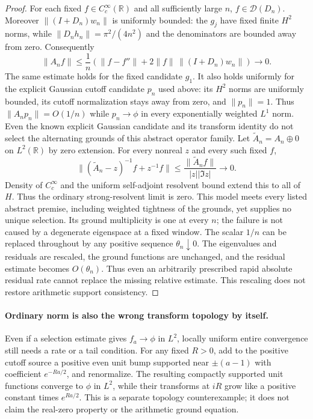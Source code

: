 \begin{proof}
For each fixed $f\in C_c^\infty(\mathbb R)$ and all sufficiently large
$n$, $f\in\mathcal D(D_n)$. Moreover
$\|(I+D_n)w_n\|$ is uniformly bounded: the $g_j$ have fixed finite
$H^2$ norms, while $\|D_nh_n\|=\pi^2/(4n^2)$ and the denominators
are bounded away from zero. Consequently
\[
 \|A_nf\|\le\frac1n\left(\|f-f''\|
        +2\|f\|\,\|(I+D_n)w_n\|\right)\longrightarrow0.
\]
The same estimate holds for the fixed candidate $g_1$. It also holds
uniformly for the explicit Gaussian cutoff candidate $p_n$ used above:
its $H^2$ norms are uniformly bounded, its cutoff normalization stays
away from zero, and $\|p_n\|=1$. Thus $\|A_np_n\|=O(1/n)$ while
$p_n\to\phi$ in every exponentially weighted $L^1$ norm. Even the
known explicit Gaussian candidate and its transform identity do not
select the alternating grounds of this abstract operator family.
Let $\widetilde A_n=A_n\oplus0$ on $L^2(\mathbb R)$ by zero extension.
For every nonreal $z$ and every such fixed $f$,
\[
 \|(\widetilde A_n-z)^{-1}f+z^{-1}f\|
 \le\frac{\|\widetilde A_nf\|}{|z||\Im z|}\to0.
\]
Density of $C_c^\infty$ and the uniform self-adjoint resolvent bound
extend this to all of $H$. Thus the ordinary strong-resolvent limit
is zero. This model meets every listed abstract premise, including
weighted tightness of the grounds, yet supplies no unique selection.
Its ground multiplicity is one at every $n$; the failure is not caused
by a degenerate eigenspace at a fixed window.
The scalar $1/n$ can be replaced throughout by any positive sequence
$\theta_n\downarrow0$. The eigenvalues and residuals are rescaled,
the ground functions are unchanged, and the residual estimate becomes
$O(\theta_n)$. Thus even an arbitrarily prescribed rapid absolute
residual rate cannot replace the missing relative estimate. This
rescaling does not restore arithmetic support consistency.
\end{proof}


\paragraph{Ordinary norm is also the wrong transform topology by itself.}
Even if a selection estimate gives $f_a\to\phi$ in $L^2$, locally
uniform entire convergence still needs a rate or a tail condition.
For any fixed $R>0$, add to the positive cutoff source a positive even
unit bump supported near $\pm(a-1)$ with coefficient $e^{-Ra/2}$,
and renormalize. The resulting compactly supported unit functions
converge to $\phi$ in $L^2$, while their transforms at $iR$ grow like
a positive constant times $e^{Ra/2}$. This is a separate topology
counterexample; it does not claim the real-zero property or the
arithmetic ground equation.

